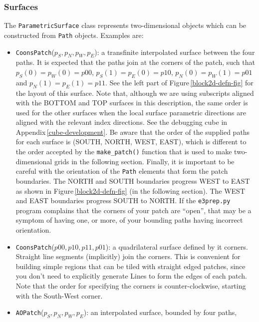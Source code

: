\subsubsection{Surfaces}
%
The \texttt{ParametricSurface} class 
represents two-dimensional objects which can be constructed from \texttt{Path} objects.
Examples are:
\begin{itemize}
\item \texttt{CoonsPatch}($p_S, p_N, p_W, p_E$): a transfinite interpolated
  surface between the four paths.
  It is expected that the paths join at the corners of the patch, such that
  $p_S(0) = p_W(0) = p00$, $p_S(1) = p_E(0) = p10$, $p_N(0) = p_W(1) = p01$ and $p_N(1) =  p_E(1) = p11$.
  See the left part of Figure\,\ref{block2d-defn-fig} for the layout of this surface.
  Note that, although we are using subscripts aligned with the BOTTOM and TOP
  surfaces in this description, the same order is used for the other surfaces
  when the local surface parametric directions are aligned with the relevant index
  directions.
  See the debugging cube in Appendix\,\ref{cube-development}.
  Be aware that the order of the supplied paths for each surface is (SOUTH, NORTH, WEST, EAST),
  which is different to the order accepted by the \texttt{make\_patch()} function 
  that is used to make two-dimensional grids in the following section.  
  Finally, it is important to be careful with the orientation of the \texttt{Path}
  elements that form the patch boundaries.
  The NORTH and SOUTH boundaries progress WEST to EAST as shown in Figure\,\ref{block2d-defn-fig}
  (in the following section).
  The WEST and EAST boundaries progress SOUTH to NORTH.
  If the \texttt{e3prep.py} program complains that the corners of your patch are ``open'',
  that may be a symptom of having one, or more, of your bounding paths having incorrect orientation.
\item \texttt{CoonsPatch}($p00, p10, p11, p01$): a quadrilateral surface defined by it corners.
  Straight line segments (implicitly) join the corners.
  This is convenient for building simple regions that can be tiled with straight edged patches,
  since you don't need to explicitly generate Lines to form the edges of each patch.
  Note that the order for specifying the corners is counter-clockwise,
  starting with the South-West corner.
\item \texttt{AOPatch}($p_S, p_N, p_W, p_E$): an interpolated surface, 
  bounded by four paths,

\end{itemize}
